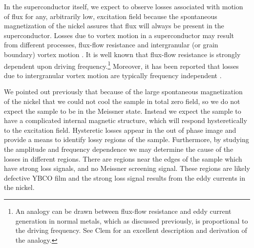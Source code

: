 %

\label{sec:flux_motion_losses}
In the superconductor itself, we expect to observe losses associated
with motion of flux
for any, arbitrarily low, excitation
field because the spontaneous magnetization of the nickel assures
that flux will always be present in the superconductor. 
Losses due to vortex motion in a superconductor may result 
from different processes, flux-flow resistance
\cite{nikolo_prb_39_6615_1989,clem_mag_sus_1991} and
intergranular (or grain boundary) vortex motion
\cite{celebi_physc_309_131_1998,muller_prb_43_7976_1991}.
It is well known that flux-flow resistance is strongly dependent
upon driving frequency.\footnote{An analogy can be drawn between 
flux-flow resistance and eddy current generation in normal metals,
which as discussed previously, is proportional to the driving 
frequency. See Clem \cite{clem_mag_sus_1991} for an excellent 
description and derivation of the analogy.} 
Moreover, it has been reported that losses due to intergranular 
vortex motion are typically frequency 
independent \cite{celebi_physc_309_131_1998}.

We pointed out previously that because of the large spontaneous
magnetization of the nickel that we could not 
cool the sample in total zero field,
so
we do not expect the sample to be in the Meissner state.
Instead we expect the sample 
to have a complicated internal magnetic structure, which
will respond hysteretically to the excitation field. Hysteretic losses
appear in the out of phase image and provide a means to identify
lossy regions of the sample. Furthermore, by studying the amplitude
and frequency dependence we may determine the cause of the losses in
different regions. There are regions near
the edges of the sample which have strong loss signals, and no Meissner
screening signal. These regions are likely defective YBCO film
and the strong loss signal results from the eddy currents in the nickel. 

